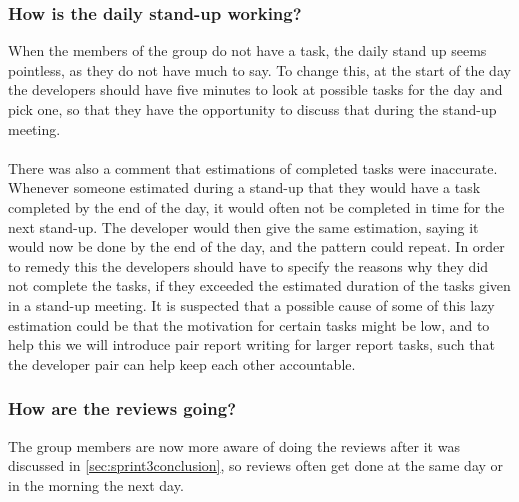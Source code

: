 \subsubsection*{How is the daily stand-up working?}
When the members of the group do not have a task, the daily stand up seems pointless, as they do not have much to say.
To change this, at the start of the day the developers should have five minutes to look at possible tasks for the day and pick one, so that they have the opportunity to discuss that during the stand-up meeting.
\\\\
There was also a comment that estimations of completed tasks were inaccurate.
Whenever someone estimated during a stand-up that they would have a task completed by the end of the day, it would often not be completed in time for the next stand-up.
The developer would then give the same estimation, saying it would now be done by the end of the day, and the pattern could repeat.
In order to remedy this the developers should have to specify the reasons why they did not complete the tasks, if they exceeded the estimated duration of the tasks given in a stand-up meeting.
It is suspected that a possible cause of some of this lazy estimation could be that the motivation for certain tasks might be low, and to help this we will introduce pair report writing for larger report tasks, such that the developer pair can help keep each other accountable.

\subsubsection*{How are the reviews going?}
The group members are now more aware of doing the reviews after it was discussed in \autoref{sec:sprint3conclusion}, so reviews often get done at the same day or in the morning the next day.
